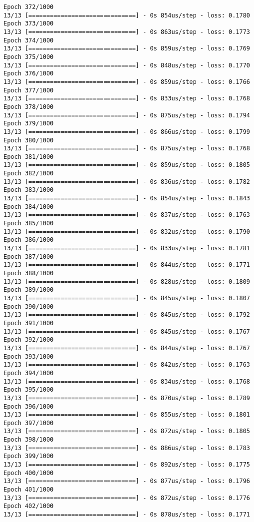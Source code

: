 \documentclass[11pt]{article}
\begin{document}
\begin{Verbatim}[commandchars=\\\{\}]
Epoch 372/1000
13/13 [==============================] - 0s 854us/step - loss: 0.1780
Epoch 373/1000
13/13 [==============================] - 0s 863us/step - loss: 0.1773
Epoch 374/1000
13/13 [==============================] - 0s 859us/step - loss: 0.1769
Epoch 375/1000
13/13 [==============================] - 0s 848us/step - loss: 0.1770
Epoch 376/1000
13/13 [==============================] - 0s 859us/step - loss: 0.1766
Epoch 377/1000
13/13 [==============================] - 0s 833us/step - loss: 0.1768
Epoch 378/1000
13/13 [==============================] - 0s 875us/step - loss: 0.1794
Epoch 379/1000
13/13 [==============================] - 0s 866us/step - loss: 0.1799
Epoch 380/1000
13/13 [==============================] - 0s 875us/step - loss: 0.1768
Epoch 381/1000
13/13 [==============================] - 0s 859us/step - loss: 0.1805
Epoch 382/1000
13/13 [==============================] - 0s 836us/step - loss: 0.1782
Epoch 383/1000
13/13 [==============================] - 0s 854us/step - loss: 0.1843
Epoch 384/1000
13/13 [==============================] - 0s 837us/step - loss: 0.1763
Epoch 385/1000
13/13 [==============================] - 0s 832us/step - loss: 0.1790
Epoch 386/1000
13/13 [==============================] - 0s 833us/step - loss: 0.1781
Epoch 387/1000
13/13 [==============================] - 0s 844us/step - loss: 0.1771
Epoch 388/1000
13/13 [==============================] - 0s 828us/step - loss: 0.1809
Epoch 389/1000
13/13 [==============================] - 0s 845us/step - loss: 0.1807
Epoch 390/1000
13/13 [==============================] - 0s 845us/step - loss: 0.1792
Epoch 391/1000
13/13 [==============================] - 0s 845us/step - loss: 0.1767
Epoch 392/1000
13/13 [==============================] - 0s 844us/step - loss: 0.1767
Epoch 393/1000
13/13 [==============================] - 0s 842us/step - loss: 0.1763
Epoch 394/1000
13/13 [==============================] - 0s 834us/step - loss: 0.1768
Epoch 395/1000
13/13 [==============================] - 0s 870us/step - loss: 0.1789
Epoch 396/1000
13/13 [==============================] - 0s 855us/step - loss: 0.1801
Epoch 397/1000
13/13 [==============================] - 0s 872us/step - loss: 0.1805
Epoch 398/1000
13/13 [==============================] - 0s 886us/step - loss: 0.1783
Epoch 399/1000
13/13 [==============================] - 0s 892us/step - loss: 0.1775
Epoch 400/1000
13/13 [==============================] - 0s 877us/step - loss: 0.1796
Epoch 401/1000
13/13 [==============================] - 0s 872us/step - loss: 0.1776
Epoch 402/1000
13/13 [==============================] - 0s 878us/step - loss: 0.1771

\end{Verbatim}
\end{document}
